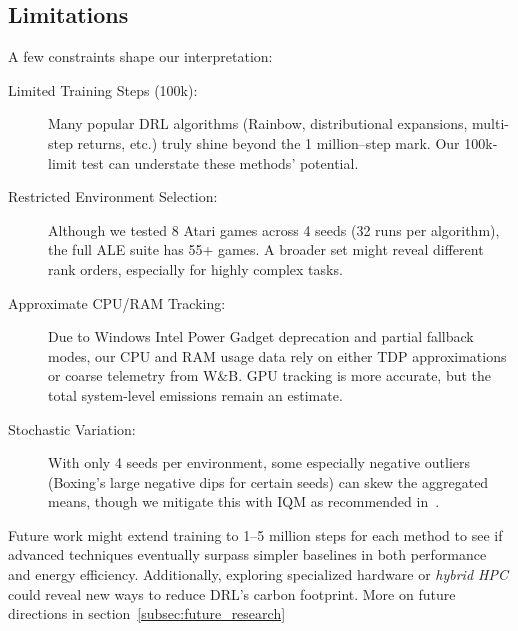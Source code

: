 \subsection{Limitations}
\label{subsec:limitations}
A few constraints shape our interpretation:
\begin{description}
	\item[Limited Training Steps (100k):]
	Many popular DRL algorithms (Rainbow, distributional expansions, multi-step returns, etc.) 
	truly shine beyond the 1 million–step mark. Our 100k-limit test can understate 
	these methods’ potential.
	
	\item[Restricted Environment Selection:]
	Although we tested 8 Atari games across 4 seeds (32 runs per algorithm), 
	the full ALE suite has 55+ games. A broader set might reveal 
	different rank orders, especially for highly complex tasks.
	
	\item[Approximate CPU/RAM Tracking:]
	Due to Windows Intel Power Gadget deprecation and partial fallback modes, 
	our CPU and RAM usage data rely on either TDP approximations or 
	coarse telemetry from W\&B. GPU tracking is more accurate, 
	but the total system-level emissions remain an estimate.
	
	\item[Stochastic Variation:]
	With only 4 seeds per environment, 
	some especially negative outliers (Boxing’s large negative dips for certain seeds) 
	can skew the aggregated means, 
	though we mitigate this with IQM as recommended in~\cite{agarwal:statistical_precipice}.
\end{description}

Future work might extend training to 1--5 million steps for each method 
to see if advanced techniques eventually surpass simpler baselines 
in both performance and energy efficiency. 
Additionally, exploring specialized hardware or \emph{hybrid HPC} 
could reveal new ways to reduce DRL’s carbon footprint. More on future directions in section~\ref{subsec:future_research}
